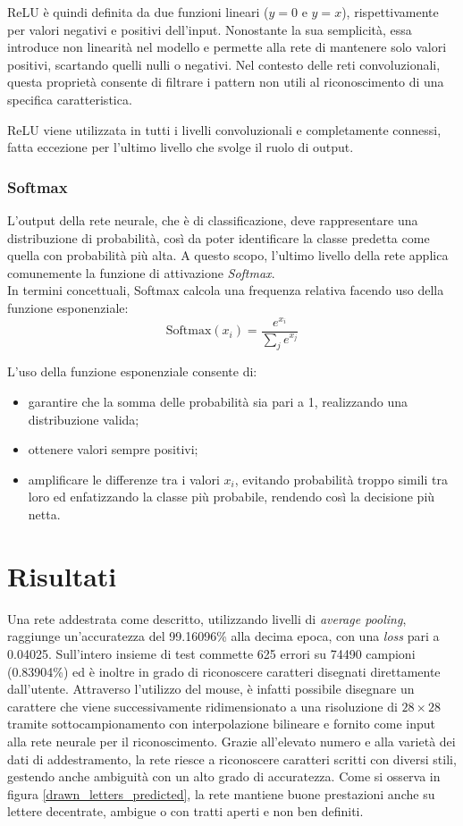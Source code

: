 \documentclass[a4paper,12pt]{article}
\begin{document}
ReLU è quindi definita da due funzioni lineari ($y=0$ e $y=x$), rispettivamente per valori negativi e positivi dell'input. Nonostante la sua semplicità, essa introduce non linearità nel modello e permette alla rete di mantenere solo valori positivi, scartando quelli nulli o negativi.  
Nel contesto delle reti convoluzionali, questa proprietà consente di filtrare i pattern non utili al riconoscimento di una specifica caratteristica.  

ReLU viene utilizzata in tutti i livelli convoluzionali e completamente connessi, fatta eccezione per l'ultimo livello che svolge il ruolo di output.

\subsubsection{Softmax}
L'output della rete neurale, che è di classificazione, deve rappresentare una distribuzione di probabilità, così da poter identificare la classe predetta come quella con probabilità più alta. A questo scopo, l'ultimo livello della rete applica comunemente la funzione di attivazione \textit{Softmax}.\\
In termini concettuali, Softmax calcola una frequenza relativa facendo uso della funzione esponenziale:
$$
    \text{Softmax}(x_i) = \frac{\displaystyle e^{\displaystyle x_i}}{\displaystyle \sum_j e^{\displaystyle x_j}}
$$

L'uso della funzione esponenziale consente di:
\begin{itemize}
    \item garantire che la somma delle probabilità sia pari a 1, realizzando una distribuzione valida;
    \item ottenere valori sempre positivi;
    \item amplificare le differenze tra i valori $x_i$, evitando probabilità troppo simili tra loro ed enfatizzando la classe più probabile, rendendo così la decisione più netta.
\end{itemize}

\section{Risultati}
Una rete addestrata come descritto, utilizzando livelli di \textit{average pooling}, raggiunge un'accuratezza del 99.16096\% alla decima epoca, con una \textit{loss} pari a 0.04025.  
Sull'intero insieme di test commette 625 errori su 74490 campioni (0.83904\%) ed è inoltre in grado di riconoscere caratteri disegnati direttamente dall'utente. Attraverso l'utilizzo del mouse, è infatti possibile disegnare un carattere che viene successivamente ridimensionato a una risoluzione di $28 \times 28$ tramite sottocampionamento con interpolazione bilineare e fornito come input alla rete neurale per il riconoscimento.
Grazie all'elevato numero e alla varietà dei dati di addestramento, la rete riesce a riconoscere caratteri scritti con diversi stili, gestendo anche ambiguità con un alto grado di accuratezza.  
Come si osserva in figura \ref{drawn_letters_predicted}, la rete mantiene buone prestazioni anche su lettere decentrate, ambigue o con tratti aperti e non ben definiti.
\end{document}
